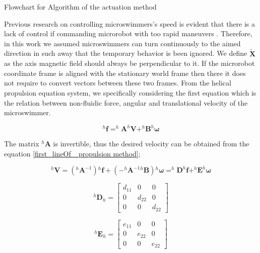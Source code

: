 \documentclass[12pt,a4paper,titlepage]{report}
\begin{document}


Flowchart for Algorithm of the actuation method


Previous research on controlling microswimmers\rq{}s speed is evident that there is a lack
of control if commanding microrobot with too rapid maneuvers \citep{zhang2009characterizing} \citep{zhang2009artificial}
. Therefore, in this work we assumed
microswimmers can turn continuously to the aimed direction in such away that the temporary behavior is been
ignored. We define $\tilde{\bm{X}}$ as the axis magnetic field should always be perpendicular to it.
If the microrobot coordinate frame is aligned with the stationary world frame then there it does not require
to convert vectors between these two frames. From the helical propulsion equation system, 
we specifically considering the first equation which is the relation between non-fluidic force, angular and 
translational velocity of the microswimmer. 



\begin{equation}
^{h}\bm{f} = ^{h}\bm{A} ^{h}\bm{V} + ^{h}\bm{B} ^{h}\bm{\omega}
\label{first_lineOf_ propulsion method}
\end{equation}

The matrix $^{h}\bm{A}$ is invertible, thus the desired velocity can be obtained from the
 equation \ref{first_lineOf_ propulsion method};


\begin{equation}
^{h}\bm{V} = (^{h}\bm{A} ^{-1}){^{h}\bm{f}} + (-^{h}\bm{A} ^{-1} {^{h}\bm{B}}){^{h}\bm{\omega}} = 
^{h}\bm{D} ^{h}\bm{f} + ^{h}\bm{E} ^{h}\bm{\omega}
\label{first_lineOf_ propulsion method2}  
\end{equation}


\begin{equation}
 ^{h}\bm{D}_h = \begin{bmatrix}
       d_{11}  & 0 		 & 0           \\[0.3em]
       0		 & d_{22}           & 0\\[0.3em]
       0           	& 0 		& d_{22}
     \end{bmatrix}
\label{Dmatrix}
\end{equation}




\begin{equation}
 ^{h}\bm{E}_h = \begin{bmatrix}
       e_{11}  & 0 		 & 0           \\[0.3em]
       0		 & e_{22}           & 0\\[0.3em]
       0           	& 0 		& e_{22}
     \end{bmatrix}
\label{Ematrix}
\end{equation}
\end{document}
